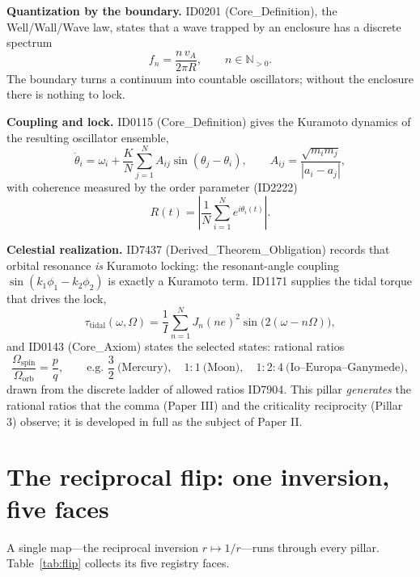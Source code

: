 \documentclass[11pt]{article}
\theoremstyle{remark}
\begin{document}
\textbf{Quantization by the boundary.} ID0201 (Core\_Definition), the Well/Wall/Wave law, states that a wave trapped by an enclosure has a discrete spectrum
\begin{equation}
f_n = \frac{n\, v_A}{2\pi R}, \qquad n \in \mathbb{N}_{>0}.
\end{equation}
The boundary turns a continuum into countable oscillators; without the enclosure there is nothing to lock.

\textbf{Coupling and lock.} ID0115 (Core\_Definition) gives the Kuramoto dynamics of the resulting oscillator ensemble,
\begin{equation}
\dot{\theta}_i = \omega_i + \frac{K}{N}\sum_{j=1}^{N} A_{ij} \sin(\theta_j - \theta_i), \qquad A_{ij} = \frac{\sqrt{m_i m_j}}{|a_i - a_j|},
\end{equation}
with coherence measured by the order parameter (ID2222)
\begin{equation}
R(t) = \left| \frac{1}{N} \sum_{i=1}^{N} e^{i\theta_i(t)} \right|.
\end{equation}

\textbf{Celestial realization.} ID7437 (Derived\_Theorem\_Obligation) records that orbital resonance \emph{is} Kuramoto locking: the resonant-angle coupling $\sin(k_1\phi_1 - k_2\phi_2)$ is exactly a Kuramoto term. ID1171 supplies the tidal torque that drives the lock,
\begin{equation}
\tau_{\mathrm{tidal}}(\omega,\Omega) = \frac{1}{I} \sum_{n=1}^{N} J_n(ne)^2 \sin\big(2(\omega - n\Omega)\big),
\end{equation}
and ID0143 (Core\_Axiom) states the selected states: rational ratios
\begin{equation}
\frac{\Omega_{\mathrm{spin}}}{\Omega_{\mathrm{orb}}} = \frac{p}{q},
\qquad \text{e.g.\ } \frac{3}{2} \ \text{(Mercury)}, \quad 1{:}1 \ \text{(Moon)}, \quad 1{:}2{:}4 \ \text{(Io--Europa--Ganymede)},
\end{equation}
drawn from the discrete ladder of allowed ratios ID7904. This pillar \emph{generates} the rational ratios that the comma (Paper III) and the criticality reciprocity (Pillar 3) observe; it is developed in full as the subject of Paper II.

\section{The reciprocal flip: one inversion, five faces}
\label{sec:flip}

A single map---the reciprocal inversion $r \mapsto 1/r$---runs through every pillar. Table~\ref{tab:flip} collects its five registry faces.
\end{document}

